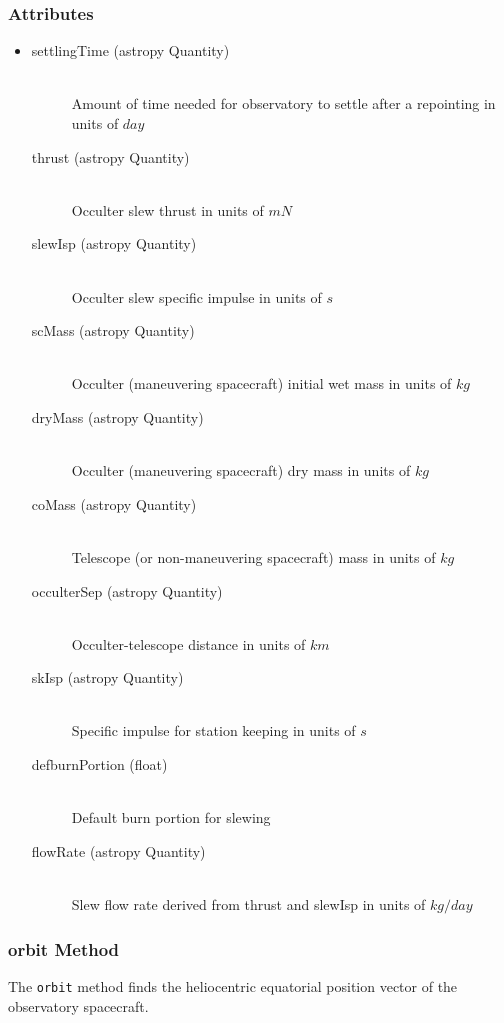 \documentclass[cleanfoot]{asme2ej}
\begin{document}
\subsubsection*{Attributes}
\begin{itemize}
\item
\begin{description}
    \item[settlingTime (astropy Quantity)] \hfill \\ Amount of time needed for observatory to settle after a repointing in units of $ day $
    \item[thrust (astropy Quantity)] \hfill \\ Occulter slew thrust in units of $ mN $
    \item[slewIsp (astropy Quantity)] \hfill \\ Occulter slew specific impulse in units of $ s $
    \item[scMass (astropy Quantity)] \hfill \\ Occulter (maneuvering spacecraft) initial wet mass in units of $ kg $
    \item[dryMass (astropy Quantity)] \hfill \\ Occulter (maneuvering spacecraft) dry mass in units of $ kg $
    \item[coMass (astropy Quantity)] \hfill \\ Telescope (or non-maneuvering spacecraft) mass in units of $ kg $
    \item[occulterSep (astropy Quantity)] \hfill \\ Occulter-telescope distance in units of $ km $
    \item[skIsp (astropy Quantity)] \hfill \\ Specific impulse for station keeping in units of $ s $
    \item[defburnPortion (float)] \hfill \\ Default burn portion for slewing
    \item[flowRate (astropy Quantity)] \hfill \\ Slew flow rate derived from thrust and slewIsp in units of $ kg/day $
\end{description}
\end{itemize}

\subsubsection{orbit Method} \label{sec:orbittask}
The \verb+orbit+ method finds the heliocentric equatorial position vector of the observatory spacecraft.
\end{document}

